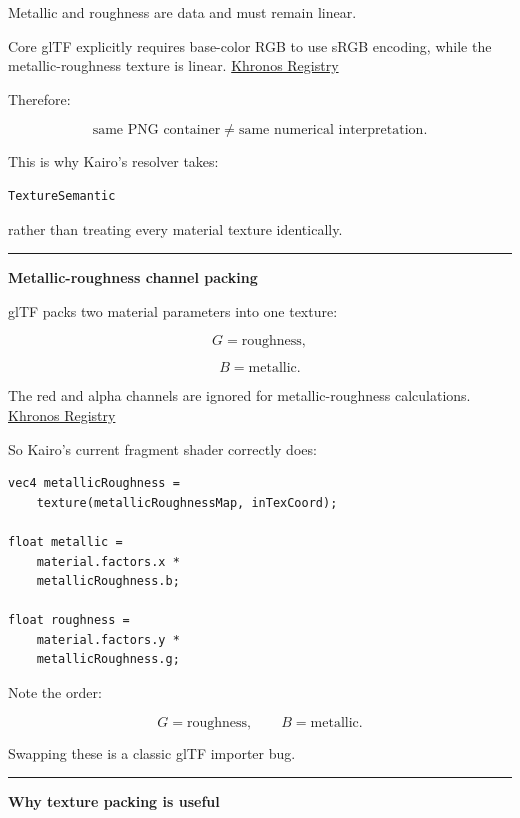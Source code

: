 Metallic and roughness are data and must remain linear.

Core glTF explicitly requires base-color RGB to use sRGB encoding, while the metallic-roughness texture is linear. \href{https://registry.khronos.org/glTF/specs/2.0/glTF-2.0.html?utm_source=chatgpt.com}{Khronos Registry}

Therefore:

\[
\boxed{
\text{same PNG container}
\neq
\text{same numerical interpretation}.
}
\]

This is why Kairo's resolver takes:

\begin{verbatim}
TextureSemantic
\end{verbatim}

rather than treating every material texture identically.

\begin{center}\rule{0.5\linewidth}{0.5pt}\end{center}

\textbf{Metallic-roughness channel packing}

glTF packs two material parameters into one texture:

\[
G=\text{roughness},
\]

\[
B=\text{metallic}.
\]

The red and alpha channels are ignored for metallic-roughness calculations. \href{https://registry.khronos.org/glTF/specs/2.0/glTF-2.0.html?utm_source=chatgpt.com}{Khronos Registry}

So Kairo's current fragment shader correctly does:

\begin{verbatim}
vec4 metallicRoughness =
    texture(metallicRoughnessMap, inTexCoord);

float metallic =
    material.factors.x *
    metallicRoughness.b;

float roughness =
    material.factors.y *
    metallicRoughness.g;
\end{verbatim}

Note the order:

\[
\boxed{
G=\text{roughness},\qquad B=\text{metallic}.
}
\]

Swapping these is a classic glTF importer bug.

\begin{center}\rule{0.5\linewidth}{0.5pt}\end{center}

\textbf{Why texture packing is useful}

